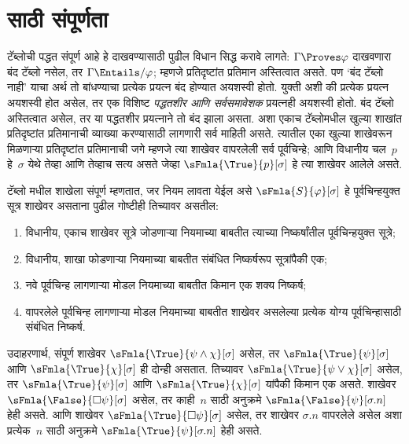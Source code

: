\section{ साठी संपूर्णता}\label{nml:tab:cpl:sec}
\begin{explain}
  टॅब्लोची पद्धत संपूर्ण आहे हे
  दाखवण्यासाठी पुढील विधान सिद्ध करावे लागते:
  $\Gamma \Proves \varphi$ दाखवणारा बंद टॅब्लो
  नसेल, तर $\Gamma \Entails/ \varphi$; म्हणजे
  प्रतिदृष्टांत प्रतिमान अस्तित्वात असते.
  पण ‘बंद टॅब्लो नाही’ याचा अर्थ
  तो बांधण्याचा प्रत्येक प्रयत्न बंद होण्यात
  अयशस्वी होतो. युक्ती अशी की प्रत्येक प्रयत्न
  अयशस्वी होत असेल, तर एक विशिष्ट
  \emph{पद्धतशीर आणि सर्वसमावेशक} प्रयत्नही
  अयशस्वी होतो. बंद टॅब्लो अस्तित्वात
  असेल, तर या पद्धतशीर प्रयत्नाने तो बंद
  झाला असता. अशा एकाच टॅब्लोमधील खुल्या
  शाखांत प्रतिदृष्टांत प्रतिमानाची व्याख्या
  करण्यासाठी लागणारी सर्व माहिती असते.
  त्यातील एका खुल्या शाखेवरून मिळणाऱ्या
  प्रतिदृष्टांत प्रतिमानाची जगे म्हणजे त्या
  शाखेवर वापरलेली सर्व पूर्वचिन्हे; आणि
  विधानीय चल~$p$ हे~$\sigma$ येथे
  तेव्हा आणि तेव्हाच सत्य असते जेव्हा
  $\sFmla{\True}{p}[\sigma]$ हे त्या
  शाखेवर आलेले असते.
\end{explain}
\begin{defn}
  टॅब्लो मधील शाखेला संपूर्ण
  म्हणतात, जर नियम लावता येईल असे
  $\sFmla{S}{\varphi}[\sigma]$ हे पूर्वचिन्हयुक्त
  सूत्र शाखेवर असताना पुढील गोष्टीही
  तिच्यावर असतील:
  \begin{enumerate}
    \item विधानीय, एकाच शाखेवर सूत्रे जोडणाऱ्या
      नियमाच्या बाबतीत त्याच्या निष्कर्षांतील
      पूर्वचिन्हयुक्त सूत्रे;
    \item विधानीय, शाखा फोडणाऱ्या नियमाच्या
      बाबतीत संबंधित निष्कर्षरूप
      सूत्रांपैकी एक;
    \item नवे पूर्वचिन्ह लागणाऱ्या मोडल नियमाच्या
      बाबतीत किमान एक शक्य निष्कर्ष;
    \item वापरलेले पूर्वचिन्ह लागणाऱ्या मोडल
      नियमाच्या बाबतीत शाखेवर असलेल्या
      प्रत्येक योग्य पूर्वचिन्हासाठी संबंधित
      निष्कर्ष.
  \end{enumerate}
\end{defn}
\begin{explain}
उदाहरणार्थ, संपूर्ण शाखेवर
$\sFmla{\True}{\psi \land \chi}[\sigma]$
असेल, तर $\sFmla{\True}{\psi}[\sigma]$
आणि $\sFmla{\True}{\chi}[\sigma]$
ही दोन्ही असतात. तिच्यावर
$\sFmla{\True}{\psi \lor \chi}[\sigma]$
असेल, तर $\sFmla{\True}{\psi}[\sigma]$
आणि $\sFmla{\True}{\chi}[\sigma]$
यांपैकी किमान एक असते.
शाखेवर $\sFmla{\False}{\Box \psi}[\sigma]$
असेल, तर काही~$n$ साठी अनुक्रमे
$\sFmla{\False}{\psi}[\sigma.n]$
हेही असते. आणि शाखेवर
$\sFmla{\True}{\Box \psi}[\sigma]$
असेल, तर शाखेवर $\sigma.n$ वापरलेले
असेल अशा प्रत्येक~$n$ साठी अनुक्रमे
$\sFmla{\True}{\psi}[\sigma.n]$
हेही असते.
\end{explain}
